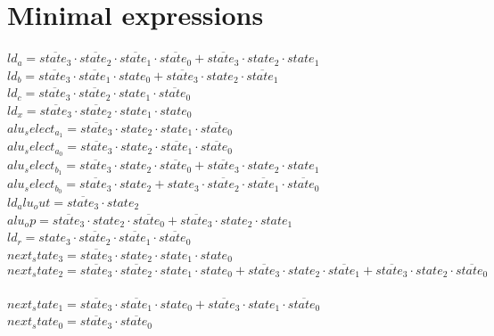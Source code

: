 \documentclass [15pt,a4paper,twoside]{article}
\begin{document}
\section{Minimal expressions}
$ld_a =  \overline{state_{3}}  \cdot  \overline{state_{2}}  \cdot  \overline{state_{1}}  \cdot  \overline{state_{0}} + \overline{state_{3}}  \cdot state_{2} \cdot state_{1}$~\\
$ld_b =  \overline{state_{3}}  \cdot  \overline{state_{1}}  \cdot state_{0}+ \overline{state_{3}}  \cdot state_{2} \cdot  \overline{state_{1}} $~\\
$ld_c =  \overline{state_{3}}  \cdot  \overline{state_{2}}  \cdot state_{1} \cdot  \overline{state_{0}} $~\\
$ld_x =  \overline{state_{3}}  \cdot  \overline{state_{2}}  \cdot state_{1} \cdot state_{0}$~\\
$alu_select_a_{1} =  \overline{state_{3}}  \cdot state_{2} \cdot state_{1} \cdot  \overline{state_{0}} $~\\
$alu_select_a_{0} =  \overline{state_{3}}  \cdot state_{2} \cdot  \overline{state_{1}}  \cdot  \overline{state_{0}} $~\\
$alu_select_b_{1} =  \overline{state_{3}}  \cdot state_{2} \cdot  \overline{state_{0}} + \overline{state_{3}}  \cdot state_{2} \cdot state_{1}$~\\
$alu_select_b_{0} =  \overline{state_{3}}  \cdot state_{2}+state_{3} \cdot  \overline{state_{2}}  \cdot  \overline{state_{1}}  \cdot  \overline{state_{0}} $~\\
$ld_alu_out =  \overline{state_{3}}  \cdot state_{2}$~\\
$alu_op =  \overline{state_{3}}  \cdot state_{2} \cdot  \overline{state_{0}} + \overline{state_{3}}  \cdot state_{2} \cdot state_{1}$~\\
$ld_r = state_{3} \cdot  \overline{state_{2}}  \cdot  \overline{state_{1}}  \cdot  \overline{state_{0}} $~\\
$next_state_{3} =  \overline{state_{3}}  \cdot state_{2} \cdot state_{1} \cdot state_{0}$~\\
$next_state_{2} =  \overline{state_{3}}  \cdot  \overline{state_{2}}  \cdot state_{1} \cdot state_{0}+ \overline{state_{3}}  \cdot state_{2} \cdot  \overline{state_{1}} + \overline{state_{3}}  \cdot state_{2} \cdot  \overline{state_{0}} $~\\
$next_state_{1} =  \overline{state_{3}}  \cdot  \overline{state_{1}}  \cdot state_{0}+ \overline{state_{3}}  \cdot state_{1} \cdot  \overline{state_{0}} $~\\
$next_state_{0} =  \overline{state_{3}}  \cdot  \overline{state_{0}} $~\\
\end{document}
